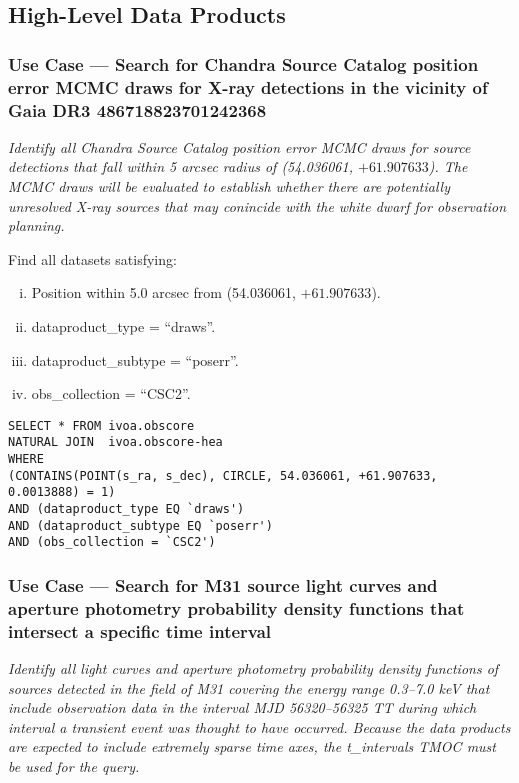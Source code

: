\subsection{High-Level Data Products}

\subsubsection{Use Case --- Search for Chandra Source Catalog position error MCMC draws for X-ray detections in the vicinity of Gaia DR3 486718823701242368}

{\em Identify all Chandra Source Catalog position error MCMC draws for source detections that fall within 5 arcsec radius of  (54.036061, $+61.907633$).  The MCMC draws will be evaluated to establish whether there are potentially unresolved X-ray sources that may conincide with the white dwarf for observation planning.\/}

\medskip
\noindent Find all datasets satisfying:
\begin{enumerate}[(i)]
  \item Position within 5.0 arcsec from (54.036061, $+61.907633$).
  \item dataproduct\_type = ``draws''.
  \item dataproduct\_subtype = ``poserr''.
  \item obs\_collection = ``CSC2''.
\end{enumerate}

\begin{verbatim}
SELECT * FROM ivoa.obscore
NATURAL JOIN  ivoa.obscore-hea 
WHERE
(CONTAINS(POINT(s_ra, s_dec), CIRCLE, 54.036061, +61.907633, 0.0013888) = 1) 
AND (dataproduct_type EQ `draws')
AND (dataproduct_subtype EQ `poserr')
AND (obs_collection = `CSC2')
\end{verbatim}


\subsubsection{Use Case --- Search for M31 source light curves and aperture photometry probability density functions that intersect a specific time interval}

{\em Identify all light curves and aperture photometry probability density functions of sources detected in the field of M31 covering the energy range 0.3--7.0 keV that include observation data in the interval MJD 56320--56325 TT during which interval a transient event was thought to have occurred.  Because the data products are expected to include extremely sparse time axes, the t\_intervals TMOC must be used for the query.\/}

